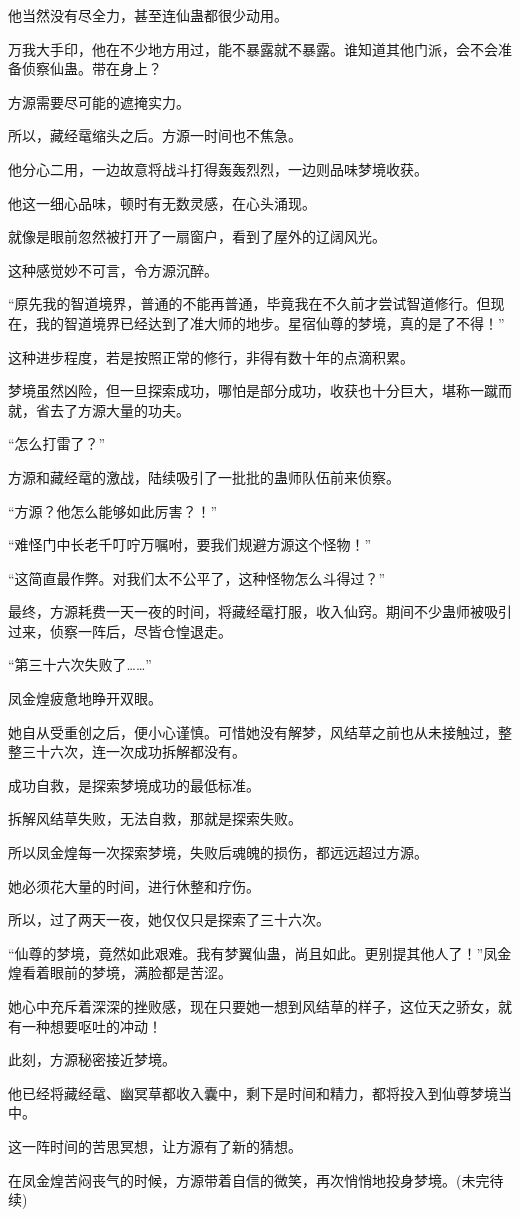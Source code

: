 \begin{this_body}
他当然没有尽全力，甚至连仙蛊都很少动用。

万我大手印，他在不少地方用过，能不暴露就不暴露。谁知道其他门派，会不会准备侦察仙蛊。带在身上？

方源需要尽可能的遮掩实力。

所以，藏经鼋缩头之后。方源一时间也不焦急。

他分心二用，一边故意将战斗打得轰轰烈烈，一边则品味梦境收获。

他这一细心品味，顿时有无数灵感，在心头涌现。

就像是眼前忽然被打开了一扇窗户，看到了屋外的辽阔风光。

这种感觉妙不可言，令方源沉醉。

“原先我的智道境界，普通的不能再普通，毕竟我在不久前才尝试智道修行。但现在，我的智道境界已经达到了准大师的地步。星宿仙尊的梦境，真的是了不得！”

这种进步程度，若是按照正常的修行，非得有数十年的点滴积累。

梦境虽然凶险，但一旦探索成功，哪怕是部分成功，收获也十分巨大，堪称一蹴而就，省去了方源大量的功夫。

“怎么打雷了？”

方源和藏经鼋的激战，陆续吸引了一批批的蛊师队伍前来侦察。

“方源？他怎么能够如此厉害？！”

“难怪门中长老千叮咛万嘱咐，要我们规避方源这个怪物！”

“这简直最作弊。对我们太不公平了，这种怪物怎么斗得过？”

最终，方源耗费一天一夜的时间，将藏经鼋打服，收入仙窍。期间不少蛊师被吸引过来，侦察一阵后，尽皆仓惶退走。

“第三十六次失败了……”

凤金煌疲惫地睁开双眼。

她自从受重创之后，便小心谨慎。可惜她没有解梦，风结草之前也从未接触过，整整三十六次，连一次成功拆解都没有。

成功自救，是探索梦境成功的最低标准。

拆解风结草失败，无法自救，那就是探索失败。

所以凤金煌每一次探索梦境，失败后魂魄的损伤，都远远超过方源。

她必须花大量的时间，进行休整和疗伤。

所以，过了两天一夜，她仅仅只是探索了三十六次。

“仙尊的梦境，竟然如此艰难。我有梦翼仙蛊，尚且如此。更别提其他人了！”凤金煌看着眼前的梦境，满脸都是苦涩。

她心中充斥着深深的挫败感，现在只要她一想到风结草的样子，这位天之骄女，就有一种想要呕吐的冲动！

此刻，方源秘密接近梦境。

他已经将藏经鼋、幽冥草都收入囊中，剩下是时间和精力，都将投入到仙尊梦境当中。

这一阵时间的苦思冥想，让方源有了新的猜想。

在凤金煌苦闷丧气的时候，方源带着自信的微笑，再次悄悄地投身梦境。(未完待续)

\end{this_body}

